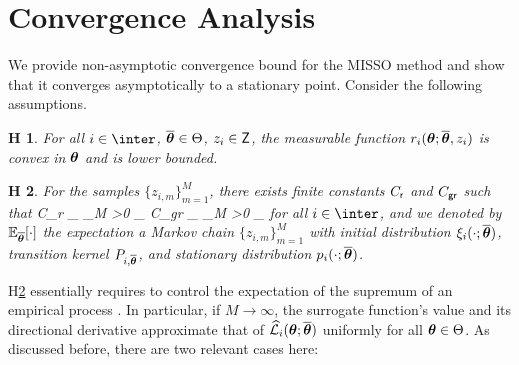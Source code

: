 \documentclass[11pt]{article}
\makeatletter
\newtheorem{assumption}{H\!\!}
\theoremstyle{t}
\DeclareRobustCommand*\cal{\@fontswitch\relax\mathcal}
\makeatother
\begin{document}
\section{Convergence Analysis}\label{sec:analysis}
We provide non-asymptotic convergence bound for the MISSO method and show that it converges asymptotically to a stationary point.
Consider the following assumptions.
\begin{assumption} \label{ass:lips}
For all $i \in \inter$, $\op \in \Param$, $z_i \in \Zset$, the measurable function $\rsur{i}{\param}{\op}{z_i}$ is convex in $\param$ and is lower bounded.
\end{assumption}
\begin{assumption}\label{controlapprox}
For the samples $\{z_{i,m}\}_{m=1}^{M}$,
there exists finite constants $C_{\sf r}$ and $C_{\sf gr}$ such that
\beq
C_{\sf r} \eqdef \sup \limits_{\op \in \Param} \sup \limits_{M >0}  \EE_{\op}\left[ \sup \limits_{\param \in \Param} \left| \sum_{m=1}^{M}{ \left\{ r_i (\param ; \op, z_{i,m})  - \sur{i}{\param}{\op} \right\} } \right| \right]
\eeq
\beq
C_{\sf gr} \eqdef \sup \limits_{\op \in \Param} \sup \limits_{M >0}  \EE_{\op}\left[ \sup \limits_{\param \in \Param} \left| \frac{1}{{M}} \sum_{m=1}^{M}{ \frac{
 \widehat{\cal L}_i'( \param , \param - \op; \op ) - r_i' (\param, \param - \op ; \op,  z_{i,m} ) }{\| \op - \param\|} }\right|^2 \right]
\eeq
for all $i \in \inter$,  and
we denoted by $\mathbb{E}_{\op} [\cdot]$ the expectation \wrt a Markov chain $\{z_{i,m}\}_{m=1}^{M}$ with  initial distribution $\xi_{i} (\cdot; \op)$, transition kernel $P_{i,\op}$, and stationary distribution $p_{i}(\cdot; \op)$.
\end{assumption}
H\ref{controlapprox} essentially requires to control the expectation of the supremum of an empirical process \citep{shapiro2009lectures,boucheron2013concentration}. In particular, if $M \rightarrow \infty$, the surrogate function's value and its directional derivative approximate that of $\sur{i}{\param}{\op}$ uniformly for all $\param \in \Param$.
As discussed before, there are two relevant cases here:
\end{document}
